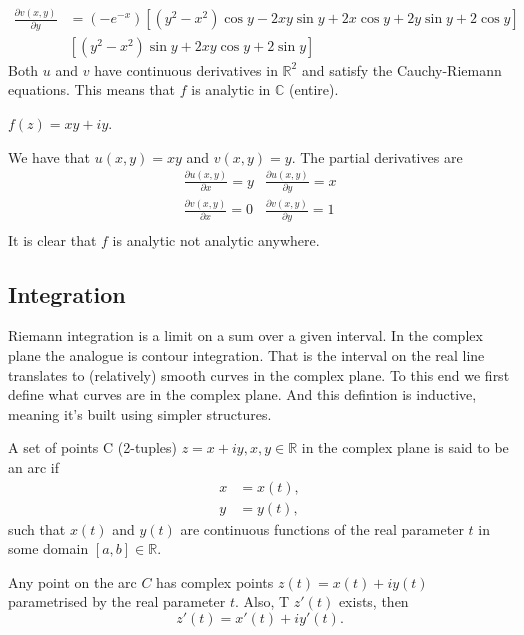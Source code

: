 \documentclass[12pt]{book}
\begin{document}
\begin{equation*}
    \begin{split}
        \frac{\partial v(x, y)}{\partial y}
           &= 
                (-e^{-x}) [(y^2 - x^2) \cos y - 2xy\sin y + 2x\cos y + 2y\sin y + 2\cos y] \\
            &
                [(y^2 - x^2)\sin y + 2xy\cos y + 2\sin y]
    \end{split}
\end{equation*}
Both $u$ and $v$ have continuous derivatives in $\mathbb{R}^{2}$ and satisfy the Cauchy-Riemann equations. This means that $f$ is analytic in $\mathbb{C}$ (entire). 

\begin{exmp}
    $f(z) = xy + iy.$
\end{exmp}
We have that $u(x, y) = xy$ and $v(x, y) = y$. The partial derivatives are
\[
    \begin{array}{cc}
        \frac{\partial u(x, y)}{\partial x} = y & \frac{\partial u(x, y)}{\partial y} = x \\
        \frac{\partial v(x, y)}{\partial x} = 0 & \frac{\partial v(x, y)}{\partial y} = 1 \\
    \end{array}
\]
It is clear that $f$ is analytic not analytic anywhere.

\subsection{Integration}
Riemann integration is a limit on a sum over a given interval. In the complex plane the analogue is contour integration. That is the interval on the real line translates to (relatively) smooth curves in the complex plane. To this end we first define what curves are in the complex plane. And this defintion is inductive, meaning it's built using simpler structures.

\begin{defn}[Curve]
    A set of points C (2-tuples) $z = x + iy, x, y \in \mathbb{R}$ in the complex plane is said to be an arc if 
    \begin{align*}
        x &= x(t), \\
        y &= y(t),
    \end{align*} 
such that $x(t)$ and $y(t)$ are continuous functions of the real parameter $t$ in some domain $[a, b] \in \mathbb{R}$. 
\end{defn}
Any point on the arc $C$ has complex points $z(t) = x(t) + iy(t)$ parametrised by the real parameter $t.$ Also, T $z'(t)$ exists, then 
\[
    z'(t) = x'(t) + iy'(t).
\]
\end{document}
